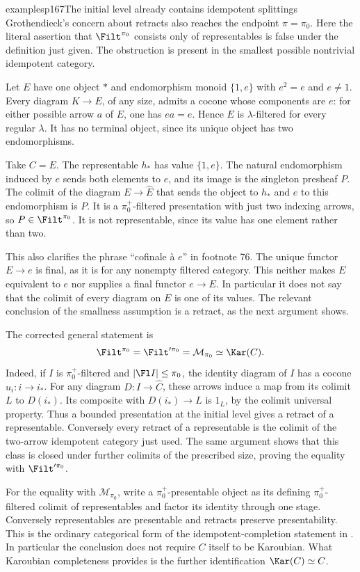 \begin{dcomment}{examples}{p167}{The initial level already contains idempotent splittings}
Grothendieck's concern about retracts also reaches the endpoint $\pi=\pi_0$. Here the literal assertion that $\Filt^{\pi_0}$ consists only of representables is false under the definition just given. The obstruction is present in the smallest possible nontrivial idempotent category.

Let $E$ have one object $*$ and endomorphism monoid $\{1,e\}$ with $e^2=e$ and $e\neq1$. Every diagram $K\to E$, of any size, admits a cocone whose components are $e$: for either possible arrow $a$ of $E$, one has $ea=e$. Hence $E$ is $\lambda$-filtered for every regular $\lambda$. It has no terminal object, since its unique object has two endomorphisms.

Take $C=E$. The representable $h_*$ has value $\{1,e\}$. The natural endomorphism induced by $e$ sends both elements to $e$, and its image is the singleton presheaf $P$. The colimit of the diagram $E\to\widehat E$ that sends the object to $h_*$ and $e$ to this endomorphism is $P$. It is a $\pi_0^+$-filtered presentation with just two indexing arrows, so $P\in\Filt^{\pi_0}$. It is not representable, since its value has one element rather than two.

This also clarifies the phrase ``cofinale \`a $e$'' in footnote 76. The unique functor $E\to e$ is final, as it is for any nonempty filtered category. This neither makes $E$ equivalent to $e$ nor supplies a final functor $e\to E$. In particular it does not say that the colimit of every diagram on $E$ is one of its values. The relevant conclusion of the smallness assumption is a retract, as the next argument shows.

The corrected general statement is
\[
 \Filt^{\pi_0}=\Filt'^{\pi_0}
 =\mathcal M_{\pi_0}\simeq\Kar(C).
\]
Indeed, if $I$ is $\pi_0^+$-filtered and $|\Fl I|\leq\pi_0$, the identity diagram of $I$ has a cocone $u_i:i\to i_*$. For any diagram $D:I\to\widehat C$, these arrows induce a map from its colimit $L$ to $D(i_*)$. Its composite with $D(i_*)\to L$ is $1_L$, by the colimit universal property. Thus a bounded presentation at the initial level gives a retract of a representable. Conversely every retract of a representable is the colimit of the two-arrow idempotent category just used. The same argument shows that this class is closed under further colimits of the prescribed size, proving the equality with $\Filt'^{\pi_0}$.

For the equality with $\mathcal M_{\pi_0}$, write a $\pi_0^+$-presentable object as its defining $\pi_0^+$-filtered colimit of representables and factor its identity through one stage. Conversely representables are presentable and retracts preserve presentability. This is the ordinary categorical form of the idempotent-completion statement in \citet[Lemma 5.4.2.4]{Lurie2009HTT}. In particular the conclusion does not require $C$ itself to be Karoubian. What Karoubian completeness provides is the further identification $\Kar(C)\simeq C$.
\end{dcomment}

